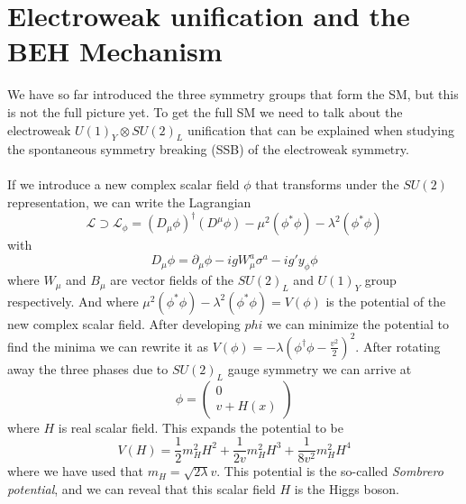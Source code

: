 \documentclass[12pt, a4paper]{book}
\begin{document}
\section{Electroweak unification and the BEH Mechanism}\label{sec:EW}
We have so far introduced the three symmetry groups that form the SM, but this is not the full picture yet. To get the full SM we need to talk about the electroweak $U(1)_Y\otimes SU(2)_L$ unification that can be explained when studying the spontaneous symmetry breaking (SSB) of the electroweak symmetry.\\%
\\If we introduce a new complex scalar field $\phi$ that transforms under the $SU(2)$ representation, we can write the Lagrangian
\begin{equation}\label{eq:electroweak}
    \mathcal{L}\supset \mathcal{L}_\phi = \left(D_\mu \phi\right)^\dagger\left(D^\mu \phi\right) -\mu^2\left(\phi^*\phi\right) - \lambda^2\left(\phi^*\phi\right)%
\end{equation}
with 
\begin{equation}\label{eq:covar_higgs}
    D_\mu \phi =\partial_\mu \phi -igW_\mu^a\sigma^a-ig'y_\phi \phi
\end{equation}
where $W_\mu$ and $B_\mu$ are vector fields of the $SU(2)_L$ and $U(1)_Y$ group respectively. And where $\mu^2\left(\phi^*\phi\right) - \lambda^2\left(\phi^*\phi\right)= V(\phi)$ is the potential of the new complex scalar field. After developing $phi$ we can 
minimize the potential to find the minima we can rewrite it as $V(\phi)=-\lambda\left(\phi^\dagger \phi -\frac{v^2}{2}\right)^2$. After rotating away the three phases due to $SU(2)_L$ gauge symmetry we can arrive at
\begin{equation}\label{eq:Higgs}
    \phi = \begin{pmatrix}
        0\\v+H(x)
    \end{pmatrix}
\end{equation}
where $H$ is real scalar field. This expands the potential to be
\begin{equation}\label{eq:sombrero}
    V(H) =\frac{1}{2}m_H^2H^2 + \frac{1}{2v}m_H^2H^3 +\frac{1}{8v^2}m_H^2H^4
\end{equation}
where we have used that $m_H = \sqrt{2\lambda}v$. This potential is the so-called \textit{Sombrero potential}, and we can reveal that this scalar field $H$ is the Higgs boson. 
\end{document}
